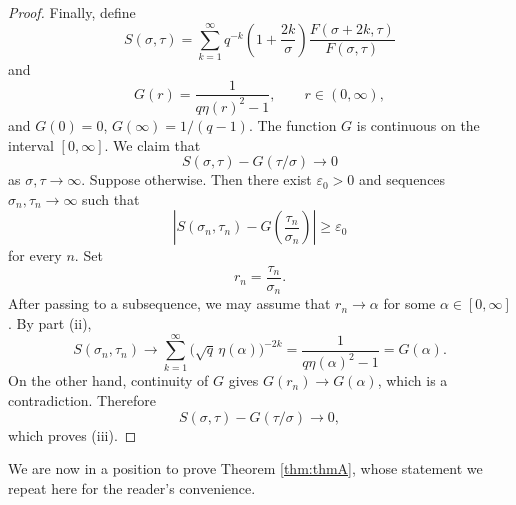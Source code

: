 \documentclass[11pt,a4paper,reqno]{amsart}
\theoremstyle{plain}
\theoremstyle{remark}
\theoremstyle{definition}
\theoremstyle{remark}
\numberwithin{equation}{section}
\begin{document}
\begin{proof}
Finally, define
\[
S(\sigma,\tau)
=
\sum_{k=1}^{\infty}
q^{-k}
\left(1+\frac{2k}{\sigma}\right)
\frac{F(\sigma+2k,\tau)}{F(\sigma,\tau)}
\]
and
\[
G(r)=\frac{1}{q\eta(r)^2-1},
\qquad r\in(0,\infty),
\]
and $G(0)=0$, 
$G(\infty)=1/(q-1)$. The function $G$ is continuous on the interval
$[0,\infty]$. We claim that
\[
S(\sigma,\tau)-G(\tau/\sigma)\to 0
\]
as $\sigma,\tau\to\infty$. Suppose otherwise. Then there exist
$\varepsilon_0>0$ and sequences $\sigma_n,\tau_n\to\infty$ such that
\[
\left|
S(\sigma_n,\tau_n)
-
G\left(\frac{\tau_n}{\sigma_n}\right)
\right|
\geq\varepsilon_0
\]
for every $n$. Set
\[
r_n=\frac{\tau_n}{\sigma_n}.
\]
After passing to a subsequence, we may assume that $r_n\to \alpha$
for some $\alpha\in[0,\infty]$. By part \rm(ii),
\[
S(\sigma_n,\tau_n)
\to 
\sum_{k=1}^{\infty}
\bigl(\sqrt q\,\eta(\alpha)\bigr)^{-2k}
=
\frac{1}{q\eta(\alpha)^2-1}
=
G(\alpha).
\]
On the other hand, continuity of $G$ gives $
G(r_n)\to  G(\alpha)$,
which is a contradiction. Therefore
\[
S(\sigma,\tau)-G(\tau/\sigma)\to 0,
\]
which proves \rm(iii).
\end{proof}

We are now in a position to prove Theorem \ref{thm:thmA}, whose statement we repeat here for the reader's convenience. 
\end{document}
